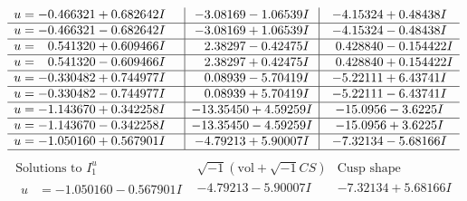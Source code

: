 \documentclass[1p]{elsarticle_modified}
\theoremstyle{definition}
\newcommand{\I}{\sqrt{-1}}
\begin{document}
$$\begin{array}{c|c|c}
\begin{aligned}
u &= -0.466321 + 0.682642 I\end{aligned}
 & -3.08169 - 1.06539 I & -4.15324 + 0.48438 I \\ \hline\begin{aligned}
u &= -0.466321 - 0.682642 I\end{aligned}
 & -3.08169 + 1.06539 I & -4.15324 - 0.48438 I \\ \hline\begin{aligned}
u &= \phantom{-}0.541320 + 0.609466 I\end{aligned}
 & \phantom{-}2.38297 - 0.42475 I & \phantom{-}0.428840 - 0.154422 I \\ \hline\begin{aligned}
u &= \phantom{-}0.541320 - 0.609466 I\end{aligned}
 & \phantom{-}2.38297 + 0.42475 I & \phantom{-}0.428840 + 0.154422 I \\ \hline\begin{aligned}
u &= -0.330482 + 0.744977 I\end{aligned}
 & \phantom{-}0.08939 - 5.70419 I & -5.22111 + 6.43741 I \\ \hline\begin{aligned}
u &= -0.330482 - 0.744977 I\end{aligned}
 & \phantom{-}0.08939 + 5.70419 I & -5.22111 - 6.43741 I \\ \hline\begin{aligned}
u &= -1.143670 + 0.342258 I\end{aligned}
 & -13.35450 + 4.59259 I & -15.0956 - 3.6225 I \\ \hline\begin{aligned}
u &= -1.143670 - 0.342258 I\end{aligned}
 & -13.35450 - 4.59259 I & -15.0956 + 3.6225 I \\ \hline\begin{aligned}
u &= -1.050160 + 0.567901 I\end{aligned}
 & -4.79213 + 5.90007 I & -7.32134 - 5.68166 I\\
 \hline 
 \end{array}$$\newpage$$\begin{array}{c|c|c}  
\text{Solutions to }I^u_{1}& \I (\text{vol} + \sqrt{-1}CS) & \text{Cusp shape}\\
 \hline 
\begin{aligned}
u &= -1.050160 - 0.567901 I\end{aligned}
 & -4.79213 - 5.90007 I & -7.32134 + 5.68166 I \\ \hline\begin{aligned}

\end{aligned}
\end{array}$$
\end{document}
